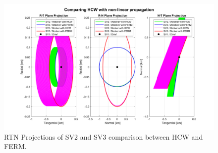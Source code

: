 \begin{figure}[htpb]
    \centering
    \includegraphics[width=0.75\linewidth]{sim/figures/PS3/RTN_projections_HCW_comparison.png}
    \caption{RTN Projections of SV2 and SV3 comparison between HCW and FERM.}
    \label{fig:hcw_comparisons_projections}
\end{figure}


